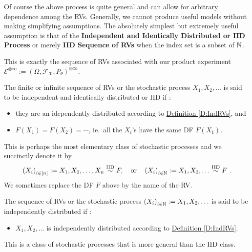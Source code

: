 Of course the above process is quite general and can allow for arbitrary dependence among the RVs.  
Generally, we cannot produce useful models without making simplifying assumptions. 
The absolutely simplest but extremely useful assumption is that of the {\bf Independent and Identically Distributed or IID Process} or merely {\bf IID Sequence of RVs} when the index set is a subset of $\mathbb{N}$. 

This is exactly the sequence of RVs associated with our product experiment $\mathcal{E}^{\otimes \infty} := (\Omega, \mathcal{F}_{\mathcal{X}}, P_{\theta})^{\otimes \infty}$.
    
\begin{definition}
The finite or infinite sequence of RVs or the stochastic process $X_1, X_2,\ldots$ is said to be independent and identically distributed or IID if :
\begin{itemize}
\item they are an idependently distributed according to \hyperref[D:IndRVs]{Definition \ref*{D:IndRVs}}, and
\item $F(X_1) = F(X_2) = \cdots $, ie.~all the $X_i$'s have the same DF $F(X_1)$.
\end{itemize}
This is perhaps the most elementary class of stochastic processes and we succinctly denote it by
\[
\left(X_i\right)_{i \in [n]} := X_1, X_2,\ldots, X_n \overset{{\rm IID}}{\sim} F, \quad \text{or} \quad \left(X_i\right)_{i \in \mathbb{N}} := X_1, X_2,\ldots  \overset{{\rm IID}}{\sim} F \ .
\]
We sometimes replace the DF $F$ above by the name of the RV.
 \end{definition}
 
\begin{definition}
The sequence of RVs or the stochastic process $\left(X_i\right)_{i \in \mathbb{N}} := X_1, X_2,\ldots$ is said to be independently distributed if :
\begin{itemize}
\item $X_1, X_2,\ldots$ is independently distributed according to \hyperref[D:IndRVs]{Definition \ref*{D:IndRVs}}.
\end{itemize}
This is a class of stochastic processes that is more general than the IID class.
\end{definition}

